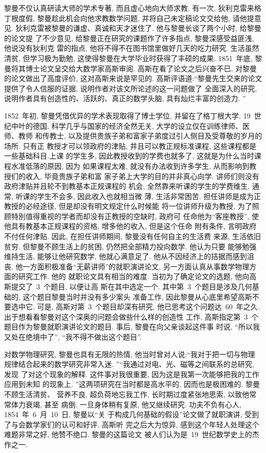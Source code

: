 黎曼不仅认真研读大师的学术专著, 而且虚心地向大师求教. 有一次, 狄利克雷来格
丁根度假, 黎曼趁此机会向他求教数学问题, 并将自己未定稿论文交给他, 请他提意见. 狄利克雷被黎曼的谦虚、真诚和天才迷住了. 他与黎曼长谈了两个小时, 给黎曼的论文提
了不少意见, 给黎曼正在研究的课题作了许多指点, 黎曼深感受益匪浅, 他说没有狄利克
雷的指点, 他将不得不在图书馆里做好几天的吃力研究. 生活虽然清贫, 但学习极为勤勉, 这使得黎曼在大学毕业时获得了丰硕的成果. 1851~年底, 黎曼将其博士论文呈交给大数学家高斯审阅. 高斯在看了论文之后兴奋不已, 对黎曼的论文做出了高度评价, 这对高斯来说是罕见的. 高斯评语道:``黎曼先生交来的论文提供了令人信服的证据, 说明作者对该文所论述的这一问题做了
全面深入的研究, 说明作者具有创造性的、活跃的、真正的数学头脑, 具有灿烂丰富的创造力. ''

1852~年初, 黎曼凭借优异的学术表现取得了博士学位, 并留在了格丁根大学. 19~世
纪中叶的德国, 科学几乎与国家的经济全然无关. 大学的设立仅在训练律师、医师、教师
和传教士, 以及提供贵族子弟和富家子弟度过引人侧目及受尊敬的岁月的场所. 只有正
教授才可以领政府的津贴, 并且可以教正规标准课程, 这些课程都是一些基础科目.上课
的学生多, 因此教授收到的学费也就多了, 这就是为什么当时课程水准低落的原因, 因为
如果课程太难, 就没有办法收到许多学生, 从而影响到教授们的收入, 毕竟贵族子弟和富
家子弟上大学的目的并非真心向学. 讲师们则没有政府津贴并且轮不到教基本正规课程的
机会, 全然靠来听课的学生的学费维生, 通常, 听课的学生不会多, 因此收入也就相当微
薄, 生活非常困苦. 担任讲师是成为正教授的必经途径, 但是却没有明文规定什么时候能
将一位讲师升级为教授, 为了照顾特別值得重视的学者而却没有正教授的空缺时, 政府可
任命他为``客座教授'', 使他具有教基本正规课程的资格, 增多他的收入, 但是这个任命
附有条件, 言明政府不付任何津贴. 因此, 在担任讲师期间, 黎曼没有任何自主的生活费
来源, 生活依旧贫穷. 但黎曼不顾生活上的贫困, 仍然把全部精力投向数学. 他认为只要
能够勉强维持生活, 能够让他研究数学, 他就心满意足了. 他从不因经济上的拮据而感到沮丧. 他一方面积极准备``无薪讲师''的就职演讲论文, 另一方面认真从事数学物理方面的研究工作. 他的
就职论文具有相当的难度. 当初为了确定论文的选题, 他向高斯提交了~3~个题目, 以便让高
斯在其中选定一个. 其中第~3~个题目是涉及几何基础的, 这个题目黎曼当时并没有多少案头
准备工作, 因此黎曼从心底里希望高斯不要选中它. 可是, 高斯对第~3~个题目却深有研究, 他已思考这个问题达~60~年之久. 出于想看看黎曼对这个深奥的问题会做些什么样的创造性
工作, 高斯指定第~3~个题目作为黎曼就职演讲论文的题目. 事后, 黎曼在向父亲谈起这件事
时说, ``所以我又处在绝境中了'', ``我不得不做出这个题目''.

对数学物理研究, 黎曼也具有无限的热情, 他当时曾对人说:``我对于把一切与物理
规律结合起来的数学研究非常入迷. ''``我通过对电、光、磁等之间联系的总研究, 发现
了对这个现象的解释. 这件事对我很重要, 因为这是我第一次能够把我的工作应用到未知
的现象上. ''这两项研究在当时都是高水平的, 因而也是极困难的. 黎曼不顾生活清贫、
营养不良, 超负荷地忘我工作, 长时期过度紧张地思索, 以致他常常体力衰竭, 甚至
病倒. 一旦身体稍有复原, 他又继续研究. 功夫不负有心人, 1854~年~6~月~10~日, 黎曼以``关
于构成几何基础的假设''论文做了就职演讲, 受到了与会数学家们的认可和好评. 高斯听
完之后大为惊异, 感到这个年轻人处理这个难题非常之好, 他赞不绝口. 黎曼的这篇论文
被人们认为是~19~世纪数学史上的杰作之一.

